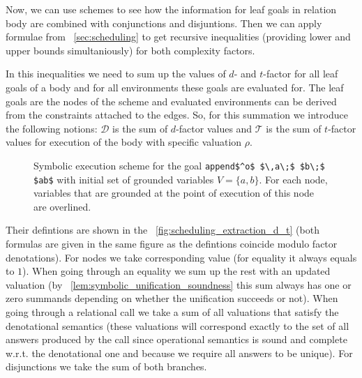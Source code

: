 Now, we can use schemes to see how the information for leaf goals in relation body are combined with conjunctions and disjuntions. Then we can apply formulae
from \sectionword~\ref{sec:scheduling} to get recursive inequalities (providing lower and upper bounds simultaniously) for both complexity factors.

In this inequalities we need to sum up the values of $d$- and $t$-factor for all leaf goals of a body and for all environments these goals are evaluated for.
The leaf goals are
the nodes of the scheme and evaluated environments can be derived from the constraints attached to the edges. So, for this summation we introduce the following notions: $\mathcal{D}$
is the sum of $d$-factor values and $\mathcal{T}$ is the sum of $t$-factor values for execution of the body with specific valuation $\rho$.

\begin{wrapfigure}{r}{0.5\textwidth}
\begin{center}
\end{center}
\caption{Symbolic execution scheme for the goal  \lstinline|append$^o$ $\,a\;$ $b\;$ $ab$|  with initial set of grounded variables $V = \{ a, b \}$. For each node, variables that
  are grounded at the point of execution of this node are overlined. }
\label{fig:example_scheme}
\end{wrapfigure}

 Their defintions are shown in
the \figureword~\ref{fig:scheduling_extraction_d_t} (both formulas are given in the same figure as the defintions coincide modulo factor denotations). For nodes we take
corresponding value (for equality it always equals to $1$). When going through an equality we sum up the rest with an updated valuation (by \lemmaword~\ref{lem:symbolic_unification_soundness}
this sum always has one or zero summands depending on whether the unification succeeds or not). When going through a relational call we take a sum of all valuations that satisfy the
denotational semantics (these valuations will correspond exactly to the set of all answers produced by the call since operational semantics is sound and complete w.r.t. the denotational
one and because we require all answers to be unique). For disjunctions we take the sum of both branches.

